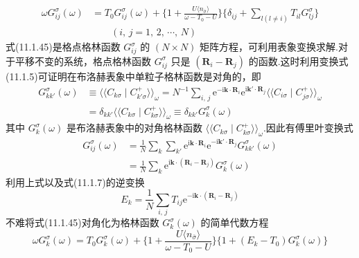 \begin{equation}
\begin{aligned}
  \omega G^{\sigma}_{ij}(\omega)&=T_{0}G^{\sigma}_{ij}(\omega)
  +\biggl\{1+\frac{U\langle n_{\bar{\sigma}}\rangle}{\omega-T_{0}-U}\biggr\}
  \bigl\{\delta_{ij}+\sum_{l(l\neq i)}T_{il}G^{\sigma}_{lj}\bigr\}\\
  &\qquad(i,\,j=1,\,2,\,\cdots,\,N)
\end{aligned}
\end{equation}
式(11.1.45)是格点格林函数 $G^{\sigma}_{ij}$ 的 $(N\times N)$ 矩阵方程，可利用表象变换求解.对于平移不变的系统，格点格林函数 $G^{\sigma}_{ij}$ 只是 $(\boldsymbol{R}_{i}-\boldsymbol{R}_{j})$ 的函数.这时利用变换式(11.1.5)可证明在布洛赫表象中单粒子格林函数是对角的，即
\begin{equation}
\begin{aligned}
  G^{\sigma}_{kk'}(\omega)&\equiv
  \langle\langle C_{k\sigma}\mid C^{+}_{k'\sigma}\rangle\rangle_{\omega}
  =N^{-1}\sum_{i,\,j}\mathrm{e}^{-\mathrm{i}\boldsymbol{k}\cdot\boldsymbol{R}_{i}}
  \mathrm{e}^{\mathrm{i}\boldsymbol{k}'\cdot\boldsymbol{R}_{j}}
  \langle\langle C_{i\sigma}\mid C^{+}_{j\sigma}\rangle\rangle_{\omega}\\
  &=\delta_{kk'}\langle\langle C_{k\sigma}\mid C^{+}_{k\sigma}\rangle\rangle_{\omega}
  \equiv\delta_{kk'}G^{\sigma}_{k}(\omega)
\end{aligned}
\end{equation}
其中 $G^{\sigma}_{k}(\omega)$ 是布洛赫表象中的对角格林函数 $\langle\langle C_{k\sigma}\mid C^{+}_{k\sigma}\rangle\rangle_{\omega}$.因此有傅里叶变换式
\begin{equation}
\begin{aligned}
  G^{\sigma}_{ij}(\omega)&=\frac{1}{N}\sum_{k}\sum_{k'}
  \mathrm{e}^{\mathrm{i}\boldsymbol{k}\cdot\boldsymbol{R}_{i}}
  \mathrm{e}^{-\mathrm{i}\boldsymbol{k}'\cdot\boldsymbol{R}_{j}}
  G^{\sigma}_{kk'}(\omega)\\
  &=\frac{1}{N}\sum_{k}\mathrm{e}^{\mathrm{i}\boldsymbol{k}\cdot(\boldsymbol{R}_{i}-\boldsymbol{R}_{j})}
  G^{\sigma}_{k}(\omega)
\end{aligned}
\end{equation}
利用上式以及式(11.1.7)的逆变换
\begin{equation}
  E_{k}=\frac{1}{N}\sum_{i,\,j}T_{ij}
  \mathrm{e}^{-\mathrm{i}\boldsymbol{k}\cdot(\boldsymbol{R}_{i}-\boldsymbol{R}_{j})}
\end{equation}
不难将式(11.1.45)对角化为格林函数 $G^{\sigma}_{k}(\omega)$ 的简单代数方程
\begin{equation}
  \omega G^{\sigma}_{k}(\omega)=T_{0}G^{\sigma}_{k}(\omega)
  +\biggl\{1+\frac{U\langle n_{\bar{\sigma}}\rangle}{\omega-T_{0}-U}\biggr\}
  \bigl\{1+(E_{k}-T_{0})G^{\sigma}_{k}(\omega)\bigr\}
\end{equation}
